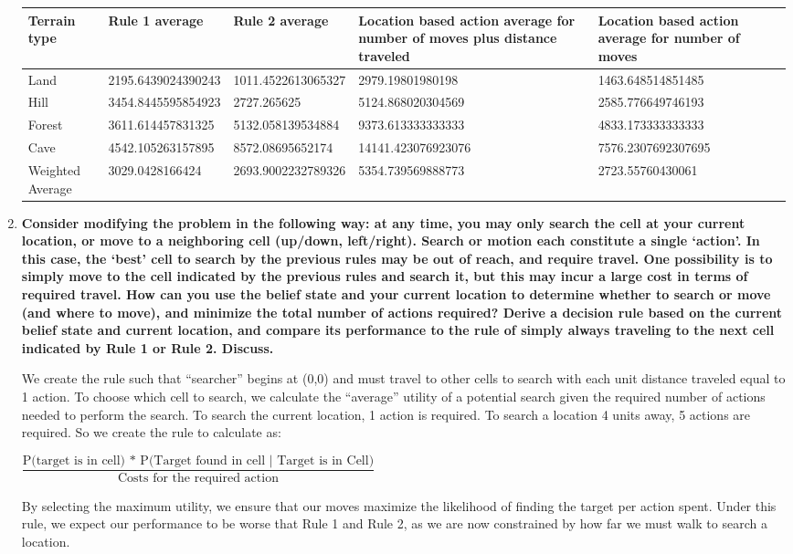 \documentclass[a4paper]{article}
\begin{document}
\begin{enumerate}
\begin{center}
\begin{tabular}{|m{4em}|m{9em}|m{9em}|m{12em}|m{9em}|}
\hline
Terrain type & Rule 1 average & Rule 2 average & Location based action average for number of moves plus distance traveled & Location based action average for number of moves\\
\hline
Land & 2195.6439024390243 & 1011.4522613065327 & 2979.19801980198 & 1463.648514851485\\
\hline
Hill & 3454.8445595854923 & 2727.265625 & 5124.868020304569 & 2585.776649746193\\
\hline
Forest & 3611.614457831325 & 5132.058139534884 & 9373.613333333333 & 4833.173333333333\\
\hline
Cave & 4542.105263157895 & 8572.08695652174 & 14141.423076923076 & 7576.2307692307695\\
\hline
Weighted Average & 3029.0428166424 & 2693.9002232789326 & 5354.739569888773 & 2723.55760430061\\
\hline
\end{tabular}
\end{center}
\bigskip

\item
\textbf{Consider modifying the problem in the following way: at any time, you may only search the cell at your current location, or move to a neighboring cell (up/down, left/right). Search or motion each constitute a single `action'. In this case, the `best' cell to search by the previous rules may be out of reach, and require travel.
One possibility is to simply move to the cell indicated by the previous rules and search it, but this may incur a large cost in terms of required travel. How can you use the belief state and your current location to determine whether to search or move (and where to move), and minimize the total number of actions required? Derive a decision rule based on the current belief state and current location, and compare its performance to the rule
of simply always traveling to the next cell indicated by Rule 1 or Rule 2. Discuss.}

We create the rule such that ``searcher'' begins at (0,0) and must travel to other cells to search with each unit distance traveled equal to 1 action. To choose which cell to search, we calculate the ``average'' utility of a potential search given the required number of actions needed to perform the search. To search the current location, 1 action is required. To search a location 4 units away, 5 actions are required. So we create the rule to calculate as:
\begin{center}
$\dfrac{\textrm{P(target\ is\ in\ cell) * P(Target\ found\ in\ cell\ |\ Target\ is\ in\ Cell)}}{\textrm{Costs\ for\ the\ required\ action}}$
\end{center}
By selecting the maximum utility, we ensure that our moves maximize the likelihood of finding the target per action spent. Under this rule, we expect our performance to be worse that Rule 1 and Rule 2, as we are now constrained by how far we must walk to search a location.


\end{enumerate}
\end{document}
